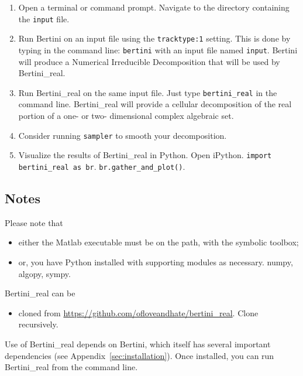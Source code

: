 \begin{enumerate}
\item Open a terminal or command prompt. Navigate to the directory containing the {\tt input} file.
\item Run Bertini on an input file using the \texttt{tracktype:1} setting. This is done by typing in the command line: \texttt{bertini} with an input file named \texttt{input}. Bertini will produce a Numerical Irreducible Decomposition that will be used by Bertini\_real.
\item Run Bertini\_real on the same input file. Just type \texttt{bertini\_real} in the command line.  Bertini\_real will provide a cellular decomposition of the real portion of a one- or two- dimensional complex algebraic set.
\item Consider running {\tt sampler} to smooth your decomposition.
\item Visualize the results of Bertini\_real in Python.  Open iPython.  
 \verb|import bertini_real as br|.  \verb|br.gather_and_plot()|.  
\end{enumerate}

\subsection*{Notes}

 Please note that 
	\begin{itemize}
	\item either the Matlab executable must be on the path, with the symbolic toolbox;
	\item or, you have Python installed with supporting modules as necessary.  numpy, algopy, sympy.
	\end{itemize}

Bertini\_real can be 
\begin{itemize}
\item cloned from \url{https://github.com/ofloveandhate/bertini_real}.   Clone recursively.
\end{itemize}
Use of Bertini\_real depends on Bertini, which itself has several important dependencies (see Appendix~\ref{sec:installation}).
Once installed, you can run Bertini\_real from the command line. 



